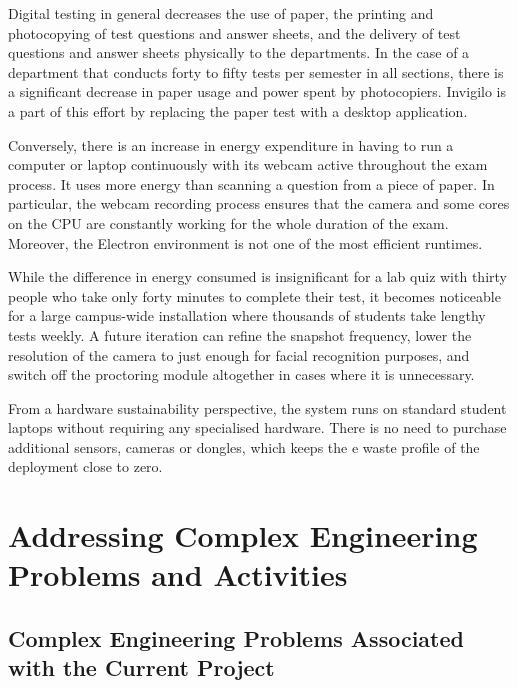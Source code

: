\documentclass[12pt, a4paper]{report}
\begin{document}
\begin{justify}
  {\fontsize{12}{18}\selectfont
    Digital testing in general decreases the use of paper, the printing and photocopying of test questions and answer sheets, and the delivery of test questions and answer sheets physically to the departments. In the case of a department that conducts forty to fifty tests per semester in all sections, there is a significant decrease in paper usage and power spent by photocopiers. Invigilo is a part of this effort by replacing the paper test with a desktop application.

    Conversely, there is an increase in energy expenditure in having to run a computer or laptop continuously with its webcam active throughout the exam process. It uses more energy than scanning a question from a piece of paper. In particular, the webcam recording process ensures that the camera and some cores on the CPU are constantly working for the whole duration of the exam. Moreover, the Electron environment is not one of the most efficient runtimes.

    While the difference in energy consumed is insignificant for a lab quiz with thirty people who take only forty minutes to complete their test, it becomes noticeable for a large campus-wide installation where thousands of students take lengthy tests weekly. A future iteration can refine the snapshot frequency, lower the resolution of the camera to just enough for facial recognition purposes, and switch off the proctoring module altogether in cases where it is unnecessary.

    From a hardware sustainability perspective, the system runs on standard student laptops without requiring any specialised hardware. There is no need to purchase additional sensors, cameras or dongles, which keeps the e waste profile of the deployment close to zero.
  }
\end{justify}

\chapter{Addressing Complex Engineering Problems and Activities}

\section{Complex Engineering Problems Associated with the Current Project}
\end{document}
